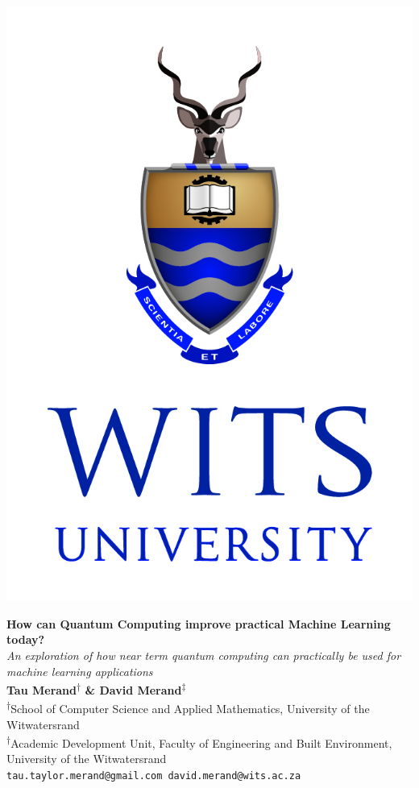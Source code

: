 \documentclass[a0,portrait]{a0poster}
\begin{document}
\begin{minipage}[c]{0.08\linewidth}%
\includegraphics[width=\linewidth]{witslogo}\\%
\end{minipage}%
\begin{minipage}[c]{0.78\linewidth}%
\centering%
\veryHuge \color{NavyBlue} \textbf{How can Quantum Computing improve practical  Machine Learning today?}%
 \color{Black}\\[0.3cm]%
\Huge\textit{An exploration of how near term quantum computing can practically be used for machine learning applications}\\[1.2cm]%
\large \textbf{Tau Merand\textsuperscript{$\dagger$} \& David Merand\textsuperscript{$\ddagger$}}\\[0.5cm]%
\normalsize \textsuperscript{$\dagger$}School of Computer Science and Applied Mathematics, University of the Witwatersrand\\%
\textsuperscript{$\dagger$}Academic Development Unit, Faculty of Engineering and Built Environment, University of the Witwatersrand\\%
\texttt{tau.taylor.merand@gmail.com david.merand@wits.ac.za}\\%
\end{minipage}%
\end{document}
